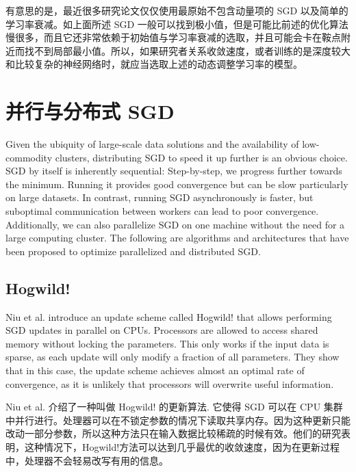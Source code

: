\documentclass{article}
\begin{document}
有意思的是，最近很多研究论文仅仅使用最原始不包含动量项的 SGD 以及简单的学习率衰减。如上面所述 SGD 一般可以找到极小值，但是可能比前述的优化算法慢很多，而且它还非常依赖于初始值与学习率衰减的选取，并且可能会卡在鞍点附近而找不到局部最小值。所以，如果研究者关系收敛速度，或者训练的是深度较大和比较复杂的神经网络时，就应当选取上述的动态调整学习率的模型。

\section{并行与分布式 SGD} \label{sec:parallelizing}

Given the ubiquity of large-scale data solutions and the availability of low-commodity clusters, distributing SGD to speed it up further is an obvious choice.
SGD by itself is inherently sequential: Step-by-step, we progress further towards the minimum. Running it provides good convergence but can be slow particularly on large datasets. In contrast, running SGD asynchronously is faster, but suboptimal communication between workers can lead to poor convergence. Additionally, we can also parallelize SGD on one machine without the need for a large computing cluster. The following are algorithms and architectures that have been proposed to optimize parallelized and distributed SGD.



\subsection{Hogwild!}

Niu et al. \cite{Niu2011} introduce an update scheme called Hogwild! that allows performing SGD updates in parallel on CPUs. Processors are allowed to access shared memory without locking the parameters. This only works if the input data is sparse, as each update will only modify a fraction of all parameters. They show that in this case, the update scheme achieves almost an optimal rate of convergence, as it is unlikely that processors will overwrite useful information.

Niu et al. \cite{Niu2011} 介绍了一种叫做 Hogwild! 的更新算法. 它使得 SGD 可以在 CPU 集群中并行进行。处理器可以在不锁定参数的情况下读取共享内存。因为这种更新只能改动一部分参数，所以这种方法只在输入数据比较稀疏的时候有效。他们的研究表明，这种情况下，Hogwild!方法可以达到几乎最优的收敛速度，因为在更新过程中，处理器不会轻易改写有用的信息。
\end{document}
